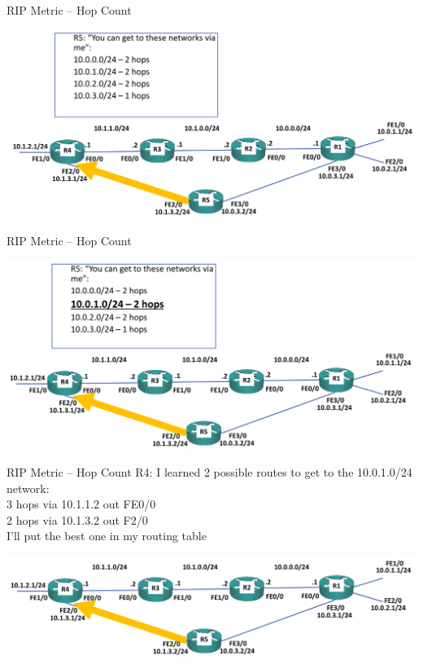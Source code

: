 \documentclass[pdflatex,compress,mathserif]{beamer}
\begin{document}
\begin{frame}{RIP Metric – Hop Count}
	\begin{center}
		\includegraphics[width=\linewidth]{img/img15}
	\end{center}
\end{frame}

\begin{frame}{RIP Metric – Hop Count}
	\begin{center}
		\includegraphics[width=\linewidth]{img/img16}
	\end{center}
\end{frame}

\begin{frame}{RIP Metric – Hop Count}
	R4: I learned 2 possible routes to get to the 10.0.1.0/24 network:
\\
	3 hops via 10.1.1.2 out FE0/0
\\
	2 hops via 10.1.3.2 out F2/0
\\
	I’ll put the best one in my routing table\\
	\begin{center}
		\includegraphics[width=\linewidth]{img/img17}
	\end{center}
\end{frame}
\end{document}
